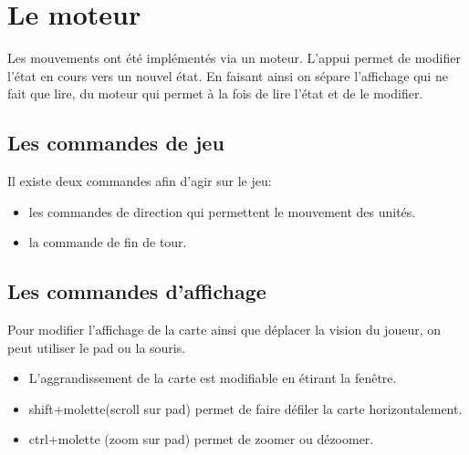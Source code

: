 \newpage





\section{Le moteur}

Les mouvements ont été implémentés via un moteur. L'appui permet de modifier l'état en cours vers un nouvel état. En faisant ainsi on sépare l'affichage qui ne fait que lire, du moteur qui permet à la fois de lire l'état et de le modifier.

\subsection{Les commandes de jeu}

Il existe deux commandes afin d'agir sur le jeu: 
\begin{itemize}
    \item les commandes de direction qui permettent le mouvement des unités.
    \item la commande de fin de tour.
\end{itemize}

\subsection{Les commandes d'affichage}
Pour modifier l'affichage de la carte ainsi que déplacer la vision du joueur, on peut utiliser le pad ou la souris.
\begin{itemize}
    \item L'aggrandissement de la carte est modifiable en étirant la fenêtre.
    \item shift+molette(scroll sur pad) permet de faire défiler la carte horizontalement.
    \item ctrl+molette (zoom sur pad) permet de zoomer ou dézoomer.
\end{itemize}


\newpage

\phantom{Texte invisible parce que j'ai pas trouvé d'autre méthode pour mettre le tableau à la ligne.}

